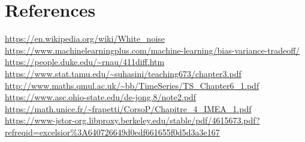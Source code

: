 \documentclass{article}
\begin{document}
\section{References}
\url{https://en.wikipedia.org/wiki/White\_noise}\\
\url{https://www.machinelearningplus.com/machine-learning/bias-variance-tradeoff/}\\
\url{https://people.duke.edu/~rnau/411diff.htm}\\
\url{https://www.stat.tamu.edu/~suhasini/teaching673/chapter3.pdf}\\
\url{http://www.maths.qmul.ac.uk/~bb/TimeSeries/TS_Chapter6_1.pdf}\\
\url{https://www.asc.ohio-state.edu/de-jong.8/note2.pdf}\\
\url{https://math.unice.fr/~frapetti/CorsoP/Chapitre_4_IMEA_1.pdf}\\
\url{https://www-jstor-org.libproxy.berkeley.edu/stable/pdf/4615673.pdf?refreqid=excelsior%3A640726649d0edf661655f0d5d3a3e167}
\end{document}
